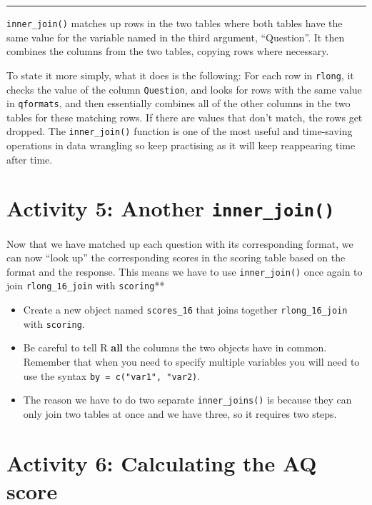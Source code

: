 \documentclass[
  oneside]{book}
\providecommand{\tightlist}{%
  \setlength{\itemsep}{0pt}\setlength{\parskip}{0pt}}
\begin{document}
\begin{center}\rule{0.5\linewidth}{0.5pt}\end{center}

\texttt{inner\_join()} matches up rows in the two tables where both tables have the same value for the variable named in the third argument, ``Question''. It then combines the columns from the two tables, copying rows where necessary.

To state it more simply, what it does is the following: For each row in \texttt{rlong}, it checks the value of the column \texttt{Question}, and looks for rows with the same value in \texttt{qformats}, and then essentially combines all of the other columns in the two tables for these matching rows. If there are values that don't match, the rows get dropped. The \texttt{inner\_join()} function is one of the most useful and time-saving operations in data wrangling so keep practising as it will keep reappearing time after time.

\hypertarget{activity-5-another-inner_join}{%
\section{\texorpdfstring{Activity 5: Another \texttt{inner\_join()}}{Activity 5: Another inner\_join()}}\label{activity-5-another-inner_join}}

Now that we have matched up each question with its corresponding format, we can now ``look up'' the corresponding scores in the scoring table based on the format and the response. This means we have to use \texttt{inner\_join()} once again to join \texttt{rlong\_16\_join} with \texttt{scoring}**

\begin{itemize}
\tightlist
\item
  Create a new object named \texttt{scores\_16} that joins together \texttt{rlong\_16\_join} with \texttt{scoring}.
\item
  Be careful to tell R \textbf{all} the columns the two objects have in common. Remember that when you need to specify multiple variables you will need to use the syntax \texttt{by\ =\ c("var1",\ "var2)}.
\item
  The reason we have to do two separate \texttt{inner\_joins()} is because they can only join two tables at once and we have three, so it requires two steps.
\end{itemize}

\hypertarget{activity-6-calculating-the-aq-score}{%
\section{Activity 6: Calculating the AQ score}\label{activity-6-calculating-the-aq-score}}
\end{document}

